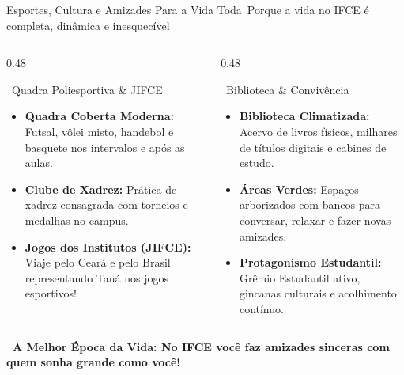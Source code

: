 \begin{frame}{Esportes, Cultura e Amizades Para a Vida Toda}{\faFutbol\ Porque a vida no IFCE é completa, dinâmica e inesquecível}
  \begin{columns}[t]
    \begin{column}{0.48\textwidth}
      \begin{greencard}{\faRunning\ Quadra Poliesportiva \& JIFCE}
        \tiny
        \begin{itemize}\setlength{\itemsep}{0.18em}
          \item \textbf{Quadra Coberta Moderna:} Futsal, vôlei misto, handebol e basquete nos intervalos e após as aulas.
          \item \textbf{Clube de Xadrez:} Prática de xadrez consagrada com torneios e medalhas no campus.
          \item \textbf{Jogos dos Institutos (JIFCE):} Viaje pelo Ceará e pelo Brasil representando Tauá nos jogos esportivos!
        \end{itemize}
      \end{greencard}
    \end{column}
    
    \begin{column}{0.48\textwidth}
      \begin{purplecard}{\faBookReader\ Biblioteca \& Convivência}
        \tiny
        \begin{itemize}\setlength{\itemsep}{0.18em}
          \item \textbf{Biblioteca Climatizada:} Acervo de livros físicos, milhares de títulos digitais e cabines de estudo.
          \item \textbf{Áreas Verdes:} Espaços arborizados com bancos para conversar, relaxar e fazer novas amizades.
          \item \textbf{Protagonismo Estudantil:} Grêmio Estudantil ativo, gincanas culturais e acolhimento contínuo.
        \end{itemize}
      \end{purplecard}
    \end{column}
  \end{columns}
  
  \vspace{0.08cm}
  \begin{center}
    \scriptsize \textcolor{IFCEDarkGreen}{\textbf{\faSmileBeam\ A Melhor Época da Vida: No IFCE você faz amizades sinceras com quem sonha grande como você!}}
  \end{center}
\end{frame}
